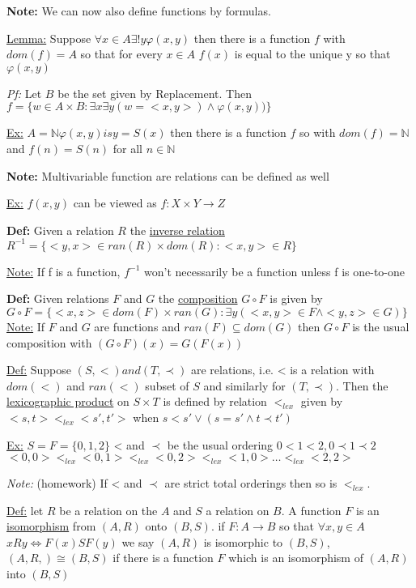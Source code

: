 \documentclass{article}
\begin{document}
    \textbf{Note:} We can now also define functions by formulas.

    \underline{Lemma:} Suppose $\forall x \in A \exists! y \varphi(x,y)$ then there is a function $f$ with $dom(f)=A$ so that for every $x \in A$ $f(x)$ is equal to the unique y so that $\varphi(x,y)$

    \emph{Pf:} Let $B$ be the set given by Replacement.
    Then $f = \{w \in A \times B : \exists x \exists y (w=<x,y>) \wedge \varphi(x,y))\}$

    \underline{Ex:} $A = \mathbb{N} \varphi(x,y) is y=S(x)$ then there is a function $f$ so with $dom(f) = \mathbb{N}$ and $f(n) =S(n)$ for all $n \in \mathbb{N}$

    \textbf{Note:} Multivariable function are relations can be defined as well

    \underline{Ex:} $f(x,y)$ can be viewed as $f: X \times Y \rightarrow Z$

    \textbf{Def:} Given a relation $R$ the \underline{inverse relation} $R^{-1}=\{<y,x> \in ran(R) \times dom(R) : <x,y> \in R\}$

    \underline{Note:} If f is a function, $f^{-1}$ won't necessarily be a function unless f is one-to-one

    \textbf{Def:} Given relations $F$ and $G$ the \underline{composition} $G \circ F$ is given by $G \circ F = \{<x,z> \in dom(F) \times ran(G): \exists y (<x,y> \in F \wedge <y,z> \in G)\}$
    \underline{Note:} If $F$ and $G$ are functions and $ran(F) \subseteq dom(G)$ then $G \circ F$ is the usual composition with $(G \circ F)(x)=G(F(x))$

    \underline{Def:} Suppose $(S,<) and (T,\prec)$ are relations, i.e. < is a relation with $dom(<)$ and $ran(<)$ subset of $S$ and similarly for $(T,\prec)$.
    Then the \underline{lexicographic product} on $S \times T$ is defined by relation $<_{lex}$ given by $<s,t>  <_{lex} <s',t'>$ when $s < s' \vee (s=s' \wedge t \prec t')$

    \underline{Ex:} $S=F=\{0,1,2\}$ < and $\prec$ be the usual ordering $0<1<2, 0 \prec 1 \prec 2$
    $<0,0> <_{lex} <0,1> <_{lex} <0,2> <_{lex} <1,0> \dots <_{lex} <2,2>$

    \emph{Note:} (homework) If < and $\prec$ are strict total orderings then so is $<_{lex}$.

    \underline{Def:} let $R$ be a relation on the $A$  and $S$ a relation on $B$.
    A function $F$ is an \underline{isomorphism} from $(A,R)$ onto $(B,S)$.
    if $F: A \rightarrow B$ so that $\forall x,y \in A$ $x R y \iff F(x) S F(y)$
    we say $(A,R)$ is isomorphic to $(B,S)$, $(A,R,) \cong (B,S)$ if there is a function $F$ which is an isomorphism of $(A,R)$ into $(B,S)$
\end{document}
